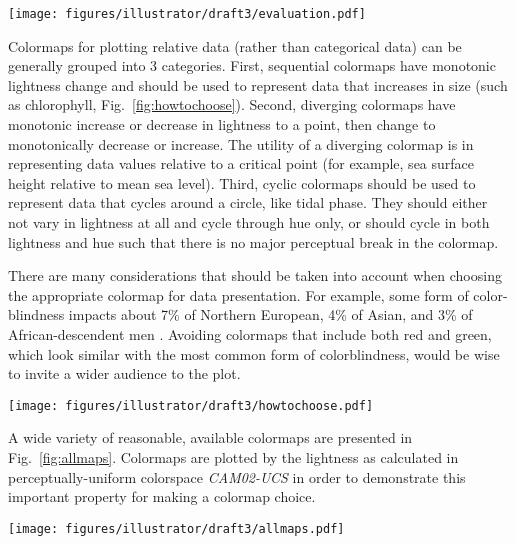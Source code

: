 \documentclass[10pt,journal,compsoc]{IEEEtran}
\begin{document}
\begin{figure*}
	\texttt{[image: figures/illustrator/draft3/evaluation.pdf]}
	\caption{}
	\label{fig:evaluation}
\end{figure*}
\nocite{kovesi2015good}
\nocite{viscm}



Colormaps for plotting relative data (rather than categorical data) can be generally grouped into 3 categories. First, sequential colormaps have monotonic lightness change and should be used to represent data that increases in size (such as chlorophyll, Fig.~\ref{fig:howtochoose}). Second, diverging colormaps have monotonic increase or decrease in lightness to a point, then change to monotonically decrease or increase. The utility of a diverging colormap is in representing data values relative to a critical point (for example, sea surface height relative to mean sea level). Third, cyclic colormaps should be used to represent data that cycles around a circle, like tidal phase. They should either not vary in lightness at all and cycle through hue only, or should cycle in both lightness and hue such that there is no major perceptual break in the colormap.

There are many considerations that should be taken into account when choosing the appropriate colormap for data presentation. For example, some form of color-blindness impacts about 7\% of Northern European, 4\% of Asian, and 3\% of African-descendent men \citep{sharpe1999opsin}. Avoiding colormaps that include both red and green, which look similar with the most common form of colorblindness, would be wise to invite a wider audience to the plot.


\begin{figure*}
	\texttt{[image: figures/illustrator/draft3/howtochoose.pdf]}
	\caption{}
	\label{fig:howtochoose}
\end{figure*}
\nocite{chlor}
\nocite{ssh}
\nocite{egbert2002efficient}


A wide variety of reasonable, available colormaps are presented in Fig.~\ref{fig:allmaps}. Colormaps are plotted by the lightness as calculated in perceptually-uniform colorspace \textit{CAM02-UCS} in order to demonstrate this important property for making a colormap choice.

\begin{figure*}
	\texttt{[image: figures/illustrator/draft3/allmaps.pdf]}
	\caption{}
	\label{fig:allmaps}
\end{figure*}
\nocite{matplotlib}
\nocite{nunez2018optimizing}
\nocite{cubehelix}
\nocite{twilight}
\nocite{matlab}
\nocite{mycarta}
\nocite{light2004end}
\nocite{brewer}
\nocite{crameri2018geodynamic}
\end{document}

